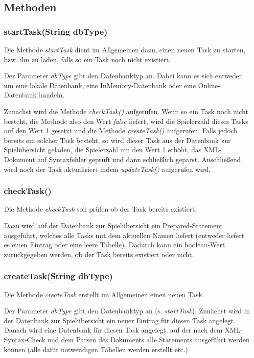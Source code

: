 \documentclass[11pt]{report}
\begin{document}
\subsection*{Methoden}

\subsubsection*{startTask(String dbType)}	

Die Methode \textit{startTask} dient im Allgemeinen dazu, einen neuen Task zu starten, bzw. ihn zu laden, falls so ein Task noch nicht existiert.

Der Parameter \textit{dbType} gibt den Datenbanktyp an. Dabei kann es sich entweder um eine lokale Datenbank, eine InMemory-Datenbank oder eine Online-Datenbank handeln.

Zunächst wird die Methode \textit{checkTask()} aufgerufen. Wenn so ein Task noch nicht besteht, die Methode also den Wert \textit{false} liefert, wird die Spielerzahl dieses Tasks auf den Wert 1 gesetzt und die Methode \textit{createTask()} aufgerufen. Falls jedoch bereits ein solcher Task besteht, so wird dieser Task aus der Datenbank zur Spielübersicht geladen, die Spielerzahl um den Wert 1 erhöht, das XML-Dokument auf Syntaxfehler geprüft und dann schließlich geparst. Anschließend wird noch der Task aktualisiert indem \textit{updateTask()} aufgerufen wird.
	
\subsubsection*{checkTask()}

Die Methode \textit{checkTask} soll prüfen ob der Task bereits existiert.

Dazu wird auf der Datenbank zur Spielübersicht ein Prepared-Statement ausgeführt, welches alle Tasks mit dem aktuellen Namen liefert (entweder liefert es einen Eintrag oder eine leere Tabelle). Dadurch kann ein boolean-Wert zurückgegeben werden, ob der Task bereits existiert oder nicht.


\subsubsection*{createTask(String dbType)}

Die Methode \textit{createTask} erstellt im Allgemeinen einen neuen Task. 

Der Parameter \textit{dbType} gibt den Datenbanktyp an (s. \textit{startTask}).
Zunächst wird in der Datenbank zur Spielübersicht ein neuer Eintrag für diesen Task angelegt. Danach wird eine Datenbank für diesen Task angelegt, auf der nach dem XML-Syntax-Check und dem Parsen des Dokuments alle Statements ausgeführt werden können (alle dafür notwendigen  Tabellen werden erstellt etc.)
\end{document}
